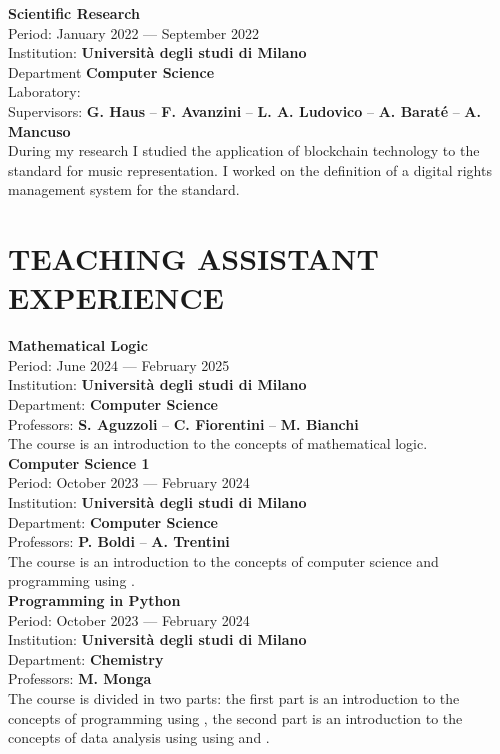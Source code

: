 \documentclass[a4paper,9pt]{extarticle}
\begin{document}
\noindent
\textbf{Scientific Research} \\
Period: January 2022 --- September 2022 \\
Institution: \textbf{Universit\`a degli studi di Milano} \\
Department \textbf{Computer Science} \\
Laboratory: \textbf{\limlab} \\
Supervisors: \textbf{G. Haus} -- \textbf{F. Avanzini} -- \textbf{L. A. Ludovico} -- \textbf{A. Barat\'e} -- \textbf{A. Mancuso} \\
During my research I studied the application of blockchain technology to the \ieeeofnn standard for music representation. I worked on the definition of a digital rights management system for the standard. \\


\section*{TEACHING ASSISTANT EXPERIENCE}

\noindent
\newline
\textbf{Mathematical Logic} \\
Period: June 2024 --- February 2025 \\
Institution: \textbf{Universit\`a degli studi di Milano} \\
Department: \textbf{Computer Science} \\
Professors: \textbf{S. Aguzzoli} -- \textbf{C. Fiorentini} -- \textbf{M. Bianchi} \\
The course is an introduction to the concepts of mathematical logic. \\

\noindent
\textbf{Computer Science 1} \\
Period: October 2023 --- February 2024 \\
Institution: \textbf{Universit\`a degli studi di Milano} \\
Department: \textbf{Computer Science} \\
Professors: \textbf{P. Boldi} -- \textbf{A. Trentini} \\
The course is an introduction to the concepts of computer science and programming using \golang. \\

\noindent
\textbf{Programming in Python} \\
Period: October 2023 --- February 2024 \\
Institution: \textbf{Universit\`a degli studi di Milano} \\
Department: \textbf{Chemistry} \\
Professors: \textbf{M. Monga} \\
The course is divided in two parts: the first part is an introduction to the concepts of programming using \python, the second part is an introduction to the concepts of data analysis using \python using \numpy and \pandas. \\
\end{document}
